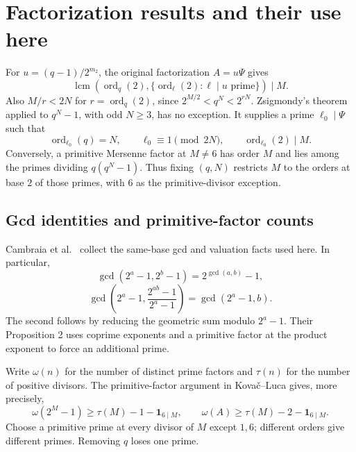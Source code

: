 \documentclass[11pt]{article}
\begin{document}
\section{Factorization results and their use here}
\label{sec:factor-results}
For $u=(q-1)/2^{m_2}$, the original factorization $A=u\Psi$ gives
\[
\operatorname{lcm}\left(\operatorname{ord}_q(2),
 \{\operatorname{ord}_\ell(2):\ell\mid u\text{ prime}\}\right)\mid M.
\]
Also $M/r<2N$ for $r=\operatorname{ord}_q(2)$, since
$2^{M/2}<q^N<2^{rN}$.
Zsigmondy's theorem applied to $q^N-1$, with odd $N\geq3$, has no
exception. It supplies a prime $\ell_0\mid\Psi$ such that
\[
\operatorname{ord}_{\ell_0}(q)=N,\qquad
\ell_0\equiv1\pmod{2N},\qquad\operatorname{ord}_{\ell_0}(2)\mid M.
\]
Conversely, a primitive Mersenne factor at $M\neq6$ has order $M$
and lies among the primes dividing $q(q^N-1)$. Thus fixing $(q,N)$
restricts $M$ to the orders at base $2$ of those primes, with $6$
as the primitive-divisor exception.

\subsection{Gcd identities and primitive-factor counts}
Cambraia et al.\ \cite[\S2, Proposition 9]{Cambraia} collect the
same-base gcd and valuation facts used here. In particular,
\[
\gcd(2^a-1,2^b-1)=2^{\gcd(a,b)}-1,
\]
\[
\gcd\left(2^a-1,\frac{2^{ab}-1}{2^a-1}\right)=\gcd(2^a-1,b).
\]
The second follows by reducing the geometric sum modulo $2^a-1$.
Their Proposition 2 uses coprime exponents and a primitive factor at
the product exponent to force an additional prime.

Write $\omega(n)$ for the number of distinct prime factors and
$\tau(n)$ for the number of positive divisors. The primitive-factor
argument in Kova\v{c}--Luca \cite[\S3]{KL} gives, more precisely,
\[
\omega(2^M-1)\geq\tau(M)-1-\mathbf1_{6\mid M},\qquad
\omega(A)\geq\tau(M)-2-\mathbf1_{6\mid M}.
\]
Choose a primitive prime at every divisor of $M$ except $1,6$;
different orders give different primes. Removing $q$ loses one prime.
\end{document}
